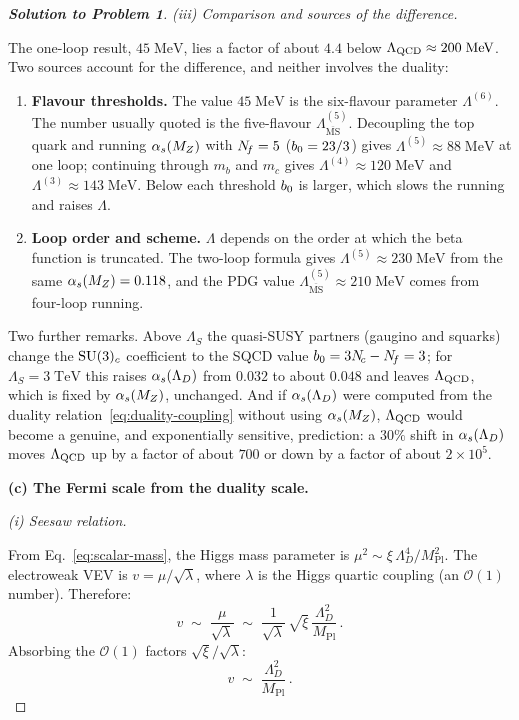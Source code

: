 \documentclass[11pt,a4paper]{article}
\begin{document}
\begin{proof}[\textbf{Solution to Problem 1}]
\textit{(iii) Comparison and sources of the difference.}

The one-loop result, $45\;\text{MeV}$, lies a factor of about $4.4$
below $\Lambda_{\mathrm{QCD}} \approx 200\;\text{MeV}$.  Two sources account
for the difference, and neither involves the duality:
\begin{enumerate}
  \item \textbf{Flavour thresholds.}  The value $45\;\text{MeV}$ is the
    six-flavour parameter $\Lambda^{(6)}$.  The number usually quoted is
    the five-flavour $\Lambda^{(5)}_{\overline{\text{MS}}}$.  Decoupling
    the top quark and running $\alpha_s(M_Z)$ with $N_{\!f} = 5$
    ($b_0 = 23/3$) gives $\Lambda^{(5)} \approx 88\;\text{MeV}$ at one
    loop; continuing through $m_b$ and $m_c$ gives
    $\Lambda^{(4)} \approx 120\;\text{MeV}$ and
    $\Lambda^{(3)} \approx 143\;\text{MeV}$.  Below each threshold
    $b_0$ is larger, which slows the running and raises $\Lambda$.

  \item \textbf{Loop order and scheme.}  $\Lambda$ depends on the order
    at which the beta function is truncated.  The two-loop formula gives
    $\Lambda^{(5)} \approx 230\;\text{MeV}$ from the same
    $\alpha_s(M_Z) = 0.118$, and the PDG value
    $\Lambda^{(5)}_{\overline{\text{MS}}} \approx 210\;\text{MeV}$ comes
    from four-loop running.
\end{enumerate}
Two further remarks.  Above $\Lambda_S$ the quasi-SUSY partners
(gaugino and squarks) change the $\mathrm{SU}(3)_c$ coefficient to the SQCD
value $b_0 = 3N_{\!c} - N_{\!f} = 3$; for $\Lambda_S = 3\;\text{TeV}$ this
raises $\alpha_s(\Lambda_D)$ from $0.032$ to about $0.048$ and leaves
$\Lambda_{\mathrm{QCD}}$, which is fixed by $\alpha_s(M_Z)$, unchanged.  And if
$\alpha_s(\Lambda_D)$ were computed from the duality
relation~\eqref{eq:duality-coupling} without using $\alpha_s(M_Z)$,
$\Lambda_{\mathrm{QCD}}$ would become a genuine, and exponentially sensitive,
prediction: a $30\%$ shift in $\alpha_s(\Lambda_D)$ moves
$\Lambda_{\mathrm{QCD}}$ up by a factor of about $700$ or down by a factor of
about $2 \times 10^{5}$.

\bigskip

\textbf{(c) The Fermi scale from the duality scale.}

\textit{(i) Seesaw relation.}

From Eq.~\eqref{eq:scalar-mass}, the Higgs mass parameter is
$\mu^2 \sim \xi\, \Lambda_D^4 / M_{\text{Pl}}^2$.  The electroweak
VEV is $v = \mu/\sqrt{\lambda}$, where $\lambda$ is the Higgs
quartic coupling (an $\mathcal{O}(1)$ number).  Therefore:
\[
  v \;\sim\; \frac{\mu}{\sqrt{\lambda}}
  \;\sim\; \frac{1}{\sqrt{\lambda}}\,
  \sqrt{\xi}\,
  \frac{\Lambda_D^2}{M_{\text{Pl}}}\,.
\]
Absorbing the $\mathcal{O}(1)$ factors $\sqrt{\xi}/\sqrt{\lambda}$:
\[
  \boxed{v \;\sim\; \frac{\Lambda_D^2}{M_{\text{Pl}}}\,.}
\]


\end{proof}
\end{document}
